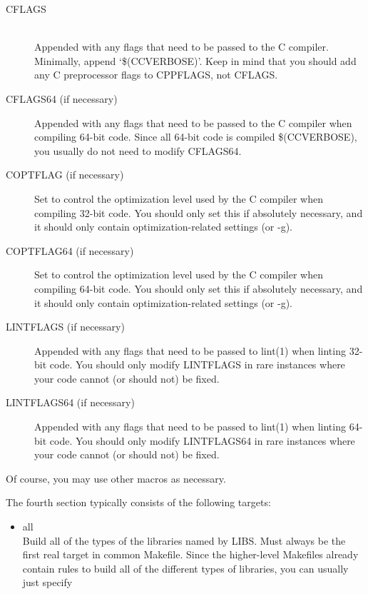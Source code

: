 \documentclass{article}
\begin{document}
\begin{description}
\item[CFLAGS] \hfill \\
  Appended with any flags that need to be passed to the C compiler. Minimally,
  append `\$(CCVERBOSE)'. Keep in mind that you should add any C preprocessor
  flags to CPPFLAGS, not CFLAGS.

\item[CFLAGS64 (if necessary)] \hfill

  Appended with any flags that need to be passed to the C compiler when compiling
  64-bit code. Since all 64-bit code is compiled \$(CCVERBOSE), you usually do not
  need to modify CFLAGS64.

\item[COPTFLAG (if necessary)] \hfill

  Set to control the optimization level used by the C compiler when compiling
  32-bit code. You should only set this if absolutely necessary, and it should
  only contain optimization-related settings (or -g).

\item[COPTFLAG64 (if necessary)] \hfill

  Set to control the optimization level used by the C compiler when compiling
  64-bit code. You should only set this if absolutely necessary, and it should
  only contain optimization-related settings (or -g).

\item[LINTFLAGS (if necessary)] \hfill 

  Appended with any flags that need to be passed to lint(1) when linting 32-bit
  code. You should only modify LINTFLAGS in rare instances where your code cannot
  (or should not) be fixed.

\item[LINTFLAGS64 (if necessary)] \hfill

  Appended with any flags that need to be passed to lint(1) when linting 64-bit
  code. You should only modify LINTFLAGS64 in rare instances where your code
  cannot (or should not) be fixed.
\end{description}

Of course, you may use other macros as necessary.

The fourth section typically consists of the following targets:

\begin{itemize}
\item all \hfill \\
  Build all of the types of the libraries named by LIBS. Must always be the
  first real target in common Makefile. Since the higher-level Makefiles
  already contain rules to build all of the different types of libraries,
  you can usually just specify
\end{itemize}
\end{document}
